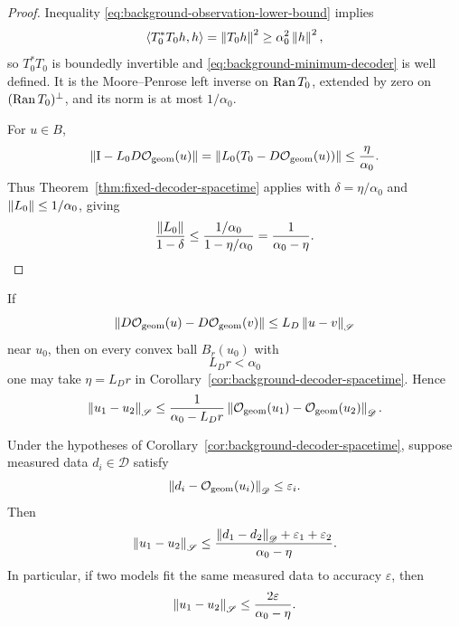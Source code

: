 \begin{proof}
Inequality \eqref{eq:background-observation-lower-bound} implies
\[
\langle T_0^*T_0h,h\rangle
=\left\lVert T_0h\right\rVert^2
\ge\alpha_0^2\left\lVert h\right\rVert^2,
\]
so $T_0^*T_0$ is boundedly invertible and \eqref{eq:background-minimum-decoder} is well defined.  It is the Moore--Penrose left inverse on $\operatorname{Ran} T_0$, extended by zero on $(\operatorname{Ran} T_0)^\perp$, and its norm is at most $1/\alpha_0$.

For $u\in B$,
\[
\left\lVert\mathrm I-L_0D\mathcal O_{\mathrm{geom}}(u)\right\rVert
=
\left\lVert L_0(T_0-D\mathcal O_{\mathrm{geom}}(u))\right\rVert
\le\frac{\eta}{\alpha_0}.
\]
Thus Theorem~\ref{thm:fixed-decoder-spacetime} applies with
$\delta=\eta/\alpha_0$ and $\left\lVert L_0\right\rVert\le1/\alpha_0$, giving
\[
\frac{\left\lVert L_0\right\rVert}{1-\delta}
\le
\frac{1/\alpha_0}{1-\eta/\alpha_0}
=
\frac1{\alpha_0-\eta}.
\]
\end{proof}

\begin{corollary}
\label{cor:lipschitz-derivative-spacetime}
If
\begin{equation}
\left\lVert D\mathcal O_{\mathrm{geom}}(u)-D\mathcal O_{\mathrm{geom}}(v)\right\rVert
\le L_D\left\lVert u-v\right\rVert_{\mathscr S}
\label{eq:geometric-derivative-lipschitz}
\end{equation}
near $u_0$, then on every convex ball $B_r(u_0)$ with
\[
L_Dr<\alpha_0
\]
one may take $\eta=L_Dr$ in Corollary~\ref{cor:background-decoder-spacetime}.  Hence
\begin{equation}
\left\lVert u_1-u_2\right\rVert_{\mathscr S}
\le
\frac1{\alpha_0-L_Dr}
\left\lVert\mathcal O_{\mathrm{geom}}(u_1)-\mathcal O_{\mathrm{geom}}(u_2)\right\rVert_{\mathscr D}.
\label{eq:lipschitz-small-ball-stability}
\end{equation}
\end{corollary}

\begin{corollary}
\label{cor:finite-error-spacetime}
Under the hypotheses of Corollary~\ref{cor:background-decoder-spacetime}, suppose measured data $d_i\in\mathscr D$ satisfy
\[
\left\lVert d_i-\mathcal O_{\mathrm{geom}}(u_i)\right\rVert_{\mathscr D}
\le\varepsilon_i.
\]
Then
\begin{equation}
\left\lVert u_1-u_2\right\rVert_{\mathscr S}
\le
\frac{
\left\lVert d_1-d_2\right\rVert_{\mathscr D}
+\varepsilon_1+\varepsilon_2
}{\alpha_0-\eta}.
\label{eq:noisy-geometric-reconstruction}
\end{equation}
In particular, if two models fit the same measured data to accuracy $\varepsilon$, then
\begin{equation}
\left\lVert u_1-u_2\right\rVert_{\mathscr S}
\le
\frac{2\varepsilon}{\alpha_0-\eta}.
\label{eq:same-data-geometric-bound}
\end{equation}
\end{corollary}

